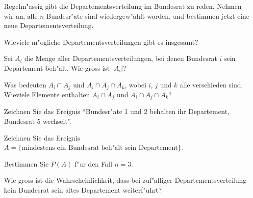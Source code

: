 Regelm"assig gibt die Departementsverteilung im Bundesrat zu reden.
Nehmen wir an, alle $n$ Bundesr"ate sind wiedergew"ahlt worden,
und bestimmen jetzt eine neue Departementsverteilung.
\begin{teilaufgaben}
\item Wieviele m"ogliche Departementsverteilungen gibt es insgesamt?
\item Sei $A_i$ die Menge aller Departementsverteilungen, bei denen
Bundesrat $i$ sein Departement beh"alt. Wie gross ist $|A_i|$?
\item Was bedeuten $A_i\cap A_j$ und $A_i\cap A_j\cap A_k$,
wobei $i$, $j$ und $k$ alle verschieden sind. Wieviele Elemente
enthalten $A_i\cap A_j$ und $A_i\cap A_j\cap A_k$?
\item Zeichnen Sie das Ereignis ``Bundesr"ate 1 und 2 behalten ihr Departement,
Bundesrat 5 wechselt''.
\item Zeichnen Sie das Ereignis $A=\{\text{mindestens ein Bundesrat beh"alt sein Departement}\}$.
\item Bestimmen Sie $P(A)$ f"ur den Fall $n=3$.
\item Wie gross ist die Wahrscheinlichkeit, dass bei zuf"alliger
Departementsverteilung kein Bundesrat sein altes Departement weiterf"uhrt?
\end{teilaufgaben}

